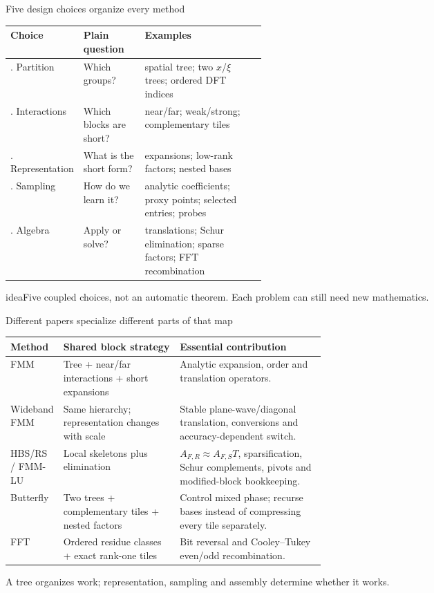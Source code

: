 \documentclass[aspectratio=169,11pt]{beamer}
\newcommand{\takeaway}[1]{\begin{beamercolorbox}[sep=0.8ex,rounded=true]{idea}\centering\large #1\end{beamercolorbox}}
\newcommand{\smallnote}[1]{{\scriptsize\color{muted}#1}}
\begin{document}
\begin{frame}{Five design choices organize every method}
\small
\begin{tabularx}{\textwidth}{@{}>{\raggedright\arraybackslash}p{0.19\linewidth}>{\raggedright\arraybackslash}p{0.24\linewidth}>{\raggedright\arraybackslash}X@{}}
\toprule
\textbf{Choice} & \textbf{Plain question} & \textbf{Examples}\\
\midrule
1. Partition & Which groups? & spatial tree; two $x$/$\xi$ trees; ordered DFT indices\\
2. Interactions & Which blocks are short? & near/far; weak/strong; complementary tiles\\
3. Representation & What is the short form? & expansions; low-rank factors; nested bases\\
4. Sampling & How do we learn it? & analytic coefficients; proxy points; selected entries; probes\\
5. Algebra & Apply or solve? & translations; Schur elimination; sparse factors; FFT recombination\\
\bottomrule
\end{tabularx}

\takeaway{Five coupled choices, not an automatic theorem. Each problem can still need new mathematics.}
\end{frame}

\begin{frame}{Different papers specialize different parts of that map}
\small
\begin{tabularx}{\textwidth}{@{}>{\raggedright\arraybackslash}p{0.16\linewidth}>{\raggedright\arraybackslash}p{0.37\linewidth}>{\raggedright\arraybackslash}X@{}}
\toprule
\textbf{Method} & \textbf{Shared block strategy} & \textbf{Essential contribution}\\
\midrule
FMM & Tree + near/far interactions + short expansions & Analytic expansion, order and translation operators.\\
Wideband FMM & Same hierarchy; representation changes with scale & Stable plane-wave/diagonal translation, conversions and accuracy-dependent switch.\\
HBS/RS / FMM-LU & Local skeletons plus elimination & $A_{F,R}\approx A_{F,S}T$, sparsification, Schur complements, pivots and modified-block bookkeeping.\\
Butterfly & Two trees + complementary tiles + nested factors & Control mixed phase; recurse bases instead of compressing every tile separately.\\
FFT & Ordered residue classes + exact rank-one tiles & Bit reversal and Cooley--Tukey even/odd recombination.\\
\bottomrule
\end{tabularx}
\smallnote{A tree organizes work; representation, sampling and assembly determine whether it works.}
\end{frame}
\end{document}
